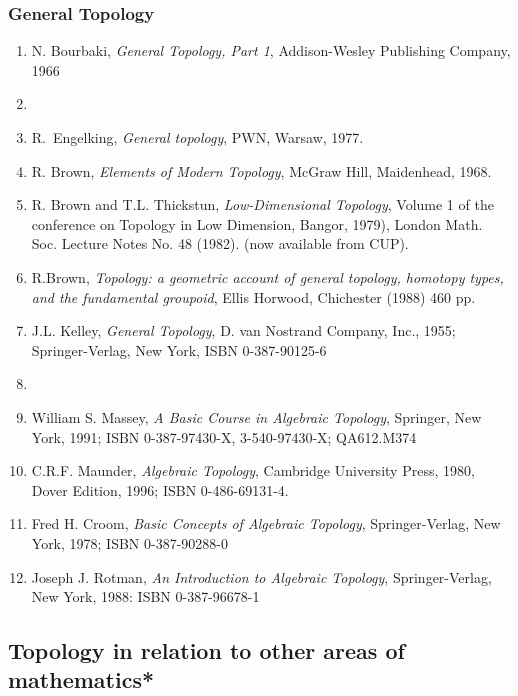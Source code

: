 \documentclass[12pt]{article}
\theoremstyle{plain}
\theoremstyle{definition}
\numberwithin{equation}{section}
\begin{document}
\subsubsection{General Topology}
\begin{enumerate}
\item N. Bourbaki, \emph{General Topology, Part 1},
Addison-Wesley Publishing Company, 1966
\item {}
\item R.~Engelking, \emph{General topology}, PWN, Warsaw, 1977.
\item R. Brown, \emph{Elements of Modern Topology}, McGraw Hill, Maidenhead, 1968.
\item R. Brown and T.L. Thickstun, \emph{Low-Dimensional Topology}, Volume 1 of the conference on Topology in Low Dimension, Bangor, 1979), London Math. Soc. Lecture Notes No. 48 (1982). (now available from CUP). 
\item R.Brown, \emph{Topology: a geometric account of general topology, homotopy types, and the fundamental groupoid}, 
Ellis Horwood, Chichester (1988) 460 pp. 
\item J.L. Kelley, \emph{General Topology}, 
D. van Nostrand Company, Inc., 1955; Springer-Verlag, New York, ISBN 0-387-90125-6
\item {}
\item William S. Massey, \emph{A Basic Course in Algebraic Topology}, Springer, New York, 1991; ISBN 0-387-97430-X, 3-540-97430-X; QA612.M374
\item C.R.F. Maunder, \emph{Algebraic Topology}, Cambridge University Press, 1980, Dover Edition, 1996; ISBN 0-486-69131-4.
\item Fred H. Croom, \emph{Basic Concepts of Algebraic Topology}, Springer-Verlag, New York, 1978; ISBN 0-387-90288-0
\item Joseph J. Rotman, \emph{An Introduction to Algebraic Topology}, Springer-Verlag, New York, 1988: ISBN 0-387-96678-1
\end{enumerate}

\subsection{Topology in relation to other areas of mathematics*}
\end{document}
